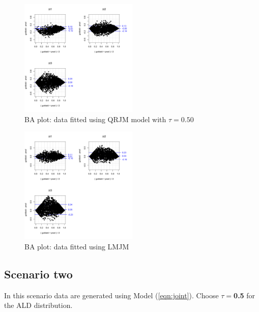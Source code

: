 \documentclass{article}
\begin{document}
\begin{figure}[H]
\centering
\includegraphics[width=0.5\textwidth]{ba_qt25data_medianfit.pdf}
\caption{BA plot: data fitted using QRJM model with $\tau=0.50$}
\end{figure}

\begin{figure}[H]
\centering
\includegraphics[width=0.5\textwidth]{ba_qt25data_meanfit.pdf}
\caption{BA plot: data fitted using LMJM}
\end{figure}



\subsection{Scenario two}
In this scenario data are generated using Model (\ref{eqn:joint}). Choose $\tau= ${\bf 0.5} for the ALD distribution.
\end{document}

